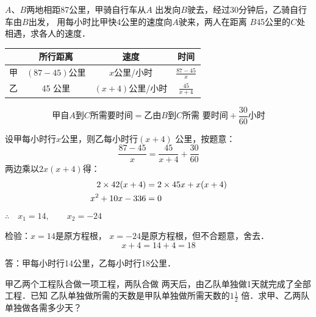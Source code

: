 \begin{example}
    $A$、$B$两地相距87公里，甲骑自行车从$A$
出发向$B$驶去，经过30分钟后，乙骑自行车由$B$出发，
用每小时比甲快4公里的速度向$A$驶来，两人在距离
$B$45公里的$C$处相遇，求各人的速度．
\end{example}

\begin{analyze}
\begin{center}
\end{center}
\begin{center}
\begin{tabular}{cccc}
    \hline
    & 所行距离 &  速度 & 时间\\
    \hline
    甲&    $(87-45)$公里&    $x$公里/小时   & $\tfrac{87-45}{x}$   \\
    乙& 45 公里&     $(x+4)$公里/小时&    $\tfrac{45}{x+4}$   \\
    \hline
\end{tabular}    
\end{center}

\[\text{甲自$A$到$C$所需要时间}=\text{乙由$B$到$C$所需
要时间}+\frac{30}{60}\text{小时}\]
\end{analyze}

\begin{solution}
    设甲每小时行$x$公里，则乙每小时行$(x+4)$
公里，按题意：
\[\frac{87-45}{x}=\frac{45}{x+4}+\frac{30}{60}  \]
两边乘以$2x(x+4)$得：
\[\begin{split}
    2\times 42(x+4) &=2\times 45x+x(x+4)\\
    x^2+10x-336&=0
\end{split}\]
$\therefore\quad x_1=14,\qquad x_2=-24$

检验：$x=14$是原方程根，
$x=-24$是原方程根，但不合题意，舍去．
\[x+4=14+4=18\]

答：甲每小时行14公里，乙每小时行18公里．
\end{solution}

\begin{example}
    甲乙两个工程队合做一项工程，两队合做
两天后，由乙队单独做1天就完成了全部工程．已知
乙队单独做所需的天数是甲队单独做所需天数的$1\frac{1}{2}$
倍．求甲、乙两队单独做各需多少天？
\end{example}

